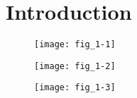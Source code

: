 \chapter{Introduction}
\label{chap:intro}

\sect{\lipsum*[1][1]}

\subsect{\lipsum*[1][2]}

\lipsum[1-3]\parencite{darwin,newton,mendel}

\begin{figure}[t] %
   \centering
   \texttt{[image: fig\_1-1]}
   \caption[{\lipsum*[1][1]}]{\lipsum*[1][1-2]}
   \label{fig:fig_1-1}
\end{figure}

\subsect{\lipsum*[1][3]}

\lipsum[4-7]\parencite{malthus,einstein,nash}

\begin{figure}[p] %
   \centering
   \texttt{[image: fig\_1-2]}
   \caption[{\lipsum*[1][2]}]{\lipsum*[1][2-6]}
   \label{fig:fig_1-2}
\end{figure}

\subsect{\lipsum*[1][4]}

\lipsum[7-10]\parencite{constable,hardy}

\subsect{\lipsum*[1][5]}

\lipsum[12-13]\parencite{morgan,sturtevant,fisher}

\begin{figure}[tb] %
   \centering
   \texttt{[image: fig\_1-3]}
   \caption[{\lipsum*[1][3]}]{\lipsum*[1][3-7]}
   \label{fig:fig_1-3}
\end{figure}

\subsect{\lipsum*[1][6]}

\lipsum[16-20]\parencite{dobzhansky,nietzsche}

\sect{\lipsum*[2][1]}

\subsect{\lipsum*[2][1]}

\lipsum[23-26]\parencite{weber}

\subsect{\lipsum*[2][2]}

